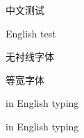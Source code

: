 \documentclass{ctexart}
\begin{document}
  	中文测试
  	
  	English test
  	
  	\sffamily 无衬线字体
  	
  	\ttfamily 等宽字体
  	
  	\sffamily in English typing
  	
  	\ttfamily in English typing
\end{document}
